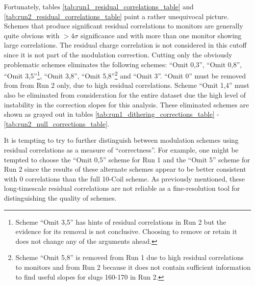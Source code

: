Fortunately, tables \ref{tab:run1_residual_correlations_table} and  \ref{tab:run2_residual_correlations_table} paint a rather unequivocal picture. Schemes that produce significant residual correlations to monitors are generally quite obvious with $>4\sigma$ significance and with more than one monitor showing large correlations. The residual charge correlation is not considered in this cutoff since it is not part of the modulation correction.  Cutting only the obviously problematic schemes eliminates the following schemes: ``Omit 0,3'', ``Omit 0,8'', ``Omit 3,5''\footnote{Scheme ``Omit 3,5'' has hints of residual correlations in Run 2 but the evidence for its removal is not conclusive. Choosing to remove or retain it does not change any of the arguments ahead.}, ``Omit 3,8'', ``Omit 5,8''\footnote{Scheme ``Omit 5,8'' is removed from Run 1 due to high residual correlations to monitors and from Run 2 because it does not contain sufficient information to find useful slopes for slugs 160-170 in Run 2.} and ``Omit 3''.  ``Omit 0'' must be removed from from Run 2 only, due to high residual correlations. Scheme ``Omit 1,4'' must also be eliminated from consideration for the entire dataset due the high level of instability in the correction slopes for this analysis. These eliminated schemes are shown as grayed out in tables \ref{tab:run1_dithering_corrections_table} - \ref{tab:run2_null_corrections_table}. 

It is tempting to try to further distinguish between modulation schemes using residual correlations as a measure of ``correctness''. For example, one might be tempted to choose the ``Omit 0,5'' scheme for Run 1 and the ``Omit 5'' scheme for Run 2 since the results of these alternate schemes appear to be better consistent with 0 correlations than the full 10-Coil scheme. As previously mentioned, these long-timescale residual correlations are not reliable as a fine-resolution tool for distinguishing the quality of schemes.

